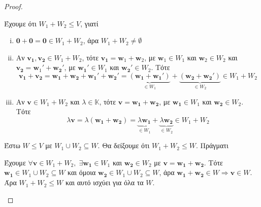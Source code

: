 \begin{proof}
\item {}
    \begin{myitemize}
    \item 
        Έχουμε ότι $ W_{1}+W_{2} \leq V $, γιατί
        \begin{enumerate}[i)]
            \item $ \mathbf{0}+ \mathbf{0} = \mathbf{0} \in W_{1}+W_{2} $, άρα 
                $ W_{1}+W_{2} \neq \emptyset $
            \item Αν $ \mathbf{v_{1}}, \mathbf{v_{2}} \in W_{1}+W_{2} $, τότε 
                $ \mathbf{v_{1}} = \mathbf{w}_{1}+ \mathbf{w}_{2} $, με 
                $ \mathbf{w}_{1} \in W_{1} $ και $ \mathbf{w}_{2} \in W_{2} $ και 
                $ \mathbf{v_{2}} = \mathbf{w}_{1}' + \mathbf{w_{2}}' $, με 
                $ \mathbf{w_{1}}' \in W_{1} $ και $ \mathbf{w_{2}}' \in W_{2} $. Τότε
                \[
                    \mathbf{v_{1}}+ \mathbf{v_{2}} = \mathbf{w_{1}}+ \mathbf{w_{2}} + 
                    \mathbf{w_{1}}' + \mathbf{w_{2}}' = \underbrace{(\mathbf{w_{1}}+
                        \mathbf{w_{1}}')}_{\in W_{1}} + \underbrace{(\mathbf{w_{2}}+ 
                    \mathbf{w_{2}}')}_{\in W_{2}} \in W_{1}+W_{2}
                \] 
            \item Αν $ \mathbf{v} \in W_{1}+W_{2} $ και $ \lambda \in \mathbb{K} $, 
                τότε $ \mathbf{v} = \mathbf{w_{1}}+ \mathbf{w_{2}} $, με 
                $ \mathbf{w_{1}} \in W_{1} $ και $ \mathbf{w_{2}} \in W_{2} $.  Τότε
                \[
                    \lambda \mathbf{v} = \lambda (\mathbf{w_{1}}+ \mathbf{w_{2}}) = 
                    \underbrace{\lambda \mathbf{w_{1}}}_{\in W_{1}} + 
                    \underbrace{\lambda \mathbf{w_{2}}}_{\in W_{2}} \in W_{1}+W_{2}
                \] 
        \end{enumerate}
    \item 
        Έστω $ W \leq V $ με $ W_{1} \cup W_{2} \subseteq W $. Θα δείξουμε ότι 
        $ W_{1}+W_{2} \leq W $.  Πράγματι

        Έχουμε $ \forall \mathbf{v} \in W_{1} + W_{2}, \; \exists \mathbf{w_{1}} 
        \in W_{1}  $ και $ \mathbf{w_{2}} \in W_{2} $ με $ \mathbf{v} = 
        \mathbf{w_{1}}+ \mathbf{w_{2}} $.  Τότε $ \mathbf{w_{1}} \in W_{1} \cup W_{2} 
        \subseteq W $
        και όμοια $ \mathbf{w_{2}} \in W_{1} \cup W_{2} \subseteq W $, άρα 
        $ \mathbf{w_{1}}+ \mathbf{w_{2}} \in W \Rightarrow \mathbf{v} \in W $. 
        Άρα $ W_{1}+W_{2} \leq W $ 
        και αυτό ισχύει για όλα τα $W$. 
    \end{myitemize}
\end{proof} 

